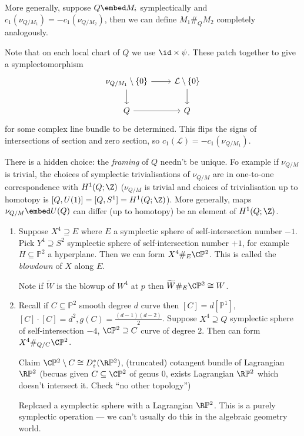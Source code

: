 \documentclass[a4paper]{article}
\renewcommand*{\P}{\mathbb{P}}
\begin{document}
More generally, suppose \(Q \embed M_i\) symplectically and \(c_1(\nu_{Q/M_1}) = -c_1(\nu_{Q/M_2})\), then we can define \(M_1 \#_Q M_2\) completely analogously.

Note that on each local chart of \(Q\) we use \(\id \times \psi\). These patch together to give a symplectomorphism
\[
  \begin{tikzcd}
    \nu_{Q/M_1} \setminus \{0\} \ar[d] \ar[r] & \mathcal L \setminus \{0\} \ar[d] \\
    Q \ar[r] & Q
  \end{tikzcd}
\]
for some complex line bundle to be determined. This flips the signs of intersections of section and zero section, so \(c_1(\mathcal L) = - c_1(\nu_{Q/M_1})\).

\begin{remark}
  There is a hidden choice: the \emph{framing} of \(Q\) needn't be unique. Fo example if \(\nu_{Q/M}\) is trivial, the choices of symplectic trivialisations of \(\nu_{Q/M}\) are in one-to-one correspondence with \(H^1(Q; \Z)\) (\(\nu_{Q/M}\) is trivial and choices of trivialisation up to homotopy is \([Q, U(1)] = [Q, S^1] = H^1(Q; \Z)\)). More generally, maps \(\nu_{Q/M} \embed U(Q)\) can differ (up to homotopy) be an element of \(H^1(Q; \Z)\).
\end{remark}

\begin{eg}\leavevmode
  \begin{enumerate}
  \item Suppose \(X^4 \supseteq E\) where \(E\) a symplectic sphere of self-intersection number \(-1\). Pick \(Y^4 \supseteq S^2\) symplectic sphere of self-intersection number \(+1\), for example \(H \subseteq \P^2\) a hyperplane. Then we can form \(X^4 \#_{E} \C\P^2\). This is called the \emph{blowdown} of \(X\) along \(E\).

    Note if \(\widetilde W\) is the blowup of \(W^4\) at \(p\) then \(\widetilde W \#_E \C\P^2 \cong W\).
  \item Recall if \(C \subseteq \P^2\) smooth degree \(d\) curve then \([C] = d [\P^1]\), \([C] \cdot [C] = d^2, g(C) = \frac{(d - 1)(d - 2)}{2}\). Suppose \(X^4 \supseteq Q\) symplectic sphere of self-intersection \(-4\), \(\C\P^2 \supseteq C\) curve of degree \(2\). Then can form \(X^4 \#_{Q/C} \C\P^2\).

    Claim \(\C\P^2 \setminus C \cong D_\varepsilon^*(\R\P^2)\), (truncated) cotangent bundle of Lagrangian \(\R\P^2\) (becuas given \(C \subseteq \C\P^2\) of genus \(0\), exists Lagrangian \(\R\P^2\) which doesn't intersect it. Check ``no other topology'')

    Replcaed a symplectic sphere with a Lagrangian \(\R\P^2\). This is a purely symplectic operation --- we can't usually do this in the algebraic geometry world.
  \end{enumerate}
\end{eg}
\end{document}
